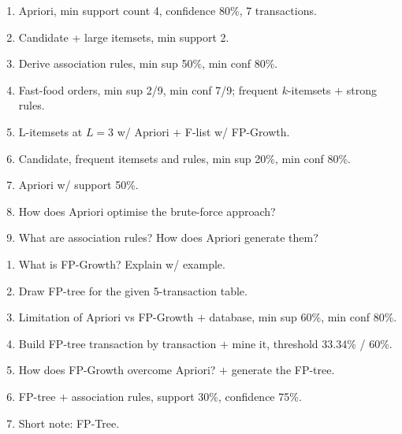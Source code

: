 \begin{enumerate}[start=7]
  \item {} Apriori, min support count 4, confidence 80\%, 7 transactions. \hfill {} 
  \item {} Candidate + large itemsets, min support 2. \hfill {} 
  \item {} Derive association rules, min sup 50\%, min conf 80\%. \hfill {} 
  \item {} Fast-food orders, min sup 2/9, min conf 7/9; frequent $k$-itemsets $+$ strong rules.
        \hfill {} 
  \item {} L-itemsets at $L=3$ w/ Apriori $+$ F-list w/ FP-Growth. \hfill {} 
  \item {} Candidate, frequent itemsets and rules, min sup 20\%, min conf 80\%. \hfill {} 
  \item {} Apriori w/ support 50\%. \hfill {} 
  \item {} How does Apriori optimise the brute-force approach? \hfill {} 
  \item {} What are association rules? How does Apriori generate them? \hfill {} 
\end{enumerate}

\begin{enumerate}[start=16]
  \item {} What is FP-Growth? Explain w/ example.
        \hfill {}       
           
  \item {} Draw FP-tree for the given 5-transaction table. \hfill {} 
  \item {} Limitation of Apriori vs FP-Growth $+$  database,
        min sup 60\%, min conf 80\%. \hfill {} 
  \item {} Build FP-tree transaction by transaction $+$ mine it, threshold 33.34\% / 60\%.
        \hfill {} 
  \item {} How does FP-Growth overcome Apriori? $+$ generate the FP-tree. \hfill {} 
  \item {} FP-tree $+$ association rules, support 30\%, confidence 75\%. \hfill {} 
  \item {} Short note: FP-Tree. \hfill {} 
\end{enumerate}

